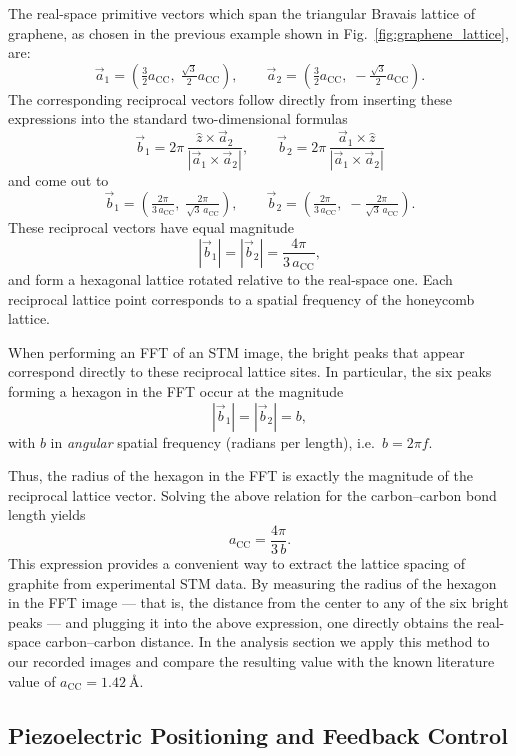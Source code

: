 \documentclass[a4paper]{article}
\begin{document}
The real-space primitive vectors which span the triangular Bravais lattice of graphene, as chosen in the previous example shown in Fig.~\ref{fig:graphene_lattice}, are:
\[
  \vec a_1 = \left( \tfrac{3}{2}a_{\mathrm{CC}},\;\tfrac{\sqrt{3}}{2}a_{\mathrm{CC}} \right),
  \qquad
  \vec a_2 = \left( \tfrac{3}{2}a_{\mathrm{CC}},\;-\tfrac{\sqrt{3}}{2}a_{\mathrm{CC}} \right).
\]
The corresponding reciprocal vectors follow directly from inserting these expressions into the standard two-dimensional formulas
\[
  \vec b_1 = 2\pi \, \frac{\hat z \times \vec a_2}{| \vec a_1 \times \vec a_2 |},
  \qquad
  \vec b_2 = 2\pi \, \frac{\vec a_1 \times \hat z}{| \vec a_1 \times \vec a_2 |}
\]
and come out to
\[
  \vec b_1 = \left( \tfrac{2\pi}{3 \, a_{\mathrm{CC}}}, \; \tfrac{2\pi}{\sqrt{3} \, a_{\mathrm{CC}}} \right),
  \qquad
  \vec b_2 = \left( \tfrac{2\pi}{3 \, a_{\mathrm{CC}}}, \; -\tfrac{2\pi}{\sqrt{3} \, a_{\mathrm{CC}}} \right).
\]
These reciprocal vectors have equal magnitude
\[
  |\vec b_1| = |\vec b_2| = \frac{4\pi}{3 \, a_{\mathrm{CC}}},
\]
and form a hexagonal lattice rotated relative to the real-space one.
Each reciprocal lattice point corresponds to a spatial frequency of the honeycomb lattice.

When performing an FFT of an STM image, the bright peaks that appear correspond directly to these reciprocal lattice sites.
In particular, the six peaks forming a hexagon in the FFT occur at the magnitude
\[
  |\vec b_1| = |\vec b_2| = b,
\]
with $b$ in \emph{angular} spatial frequency (radians per length), i.e.\ $b = 2\pi f$.

Thus, the radius of the hexagon in the FFT is exactly the magnitude of the reciprocal lattice vector.
Solving the above relation for the carbon–carbon bond length yields
\begin{equation}
  a_{\mathrm{CC}} = \frac{4\pi}{3 \, b}.
  \label{eq:cc_length}
\end{equation}
This expression provides a convenient way to extract the lattice spacing of graphite from experimental STM data.
By measuring the radius of the hexagon in the FFT image — that is, the distance from the center to any of the six bright peaks — and plugging it into the above expression, one directly obtains the real-space carbon–carbon distance.
In the analysis section we apply this method to our recorded images and compare the resulting value with the known literature value of $a_{\mathrm{CC}} = 1.42~\text{\AA}$.

\subsection{Piezoelectric Positioning and Feedback Control}
\end{document}
